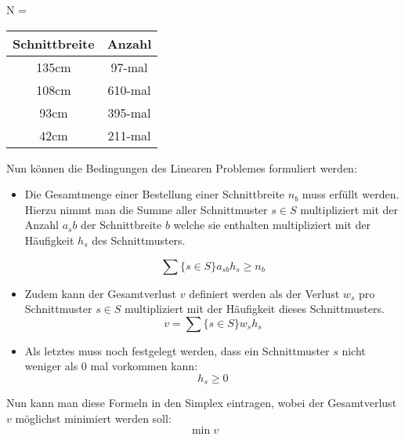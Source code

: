 \begin{itemize}
\begin{itemize}
N = \begin{tabular}{|c|c|}
\hline Schnittbreite & Anzahl \\
\hline 135cm & 97-mal \\ 
\hline 108cm & 610-mal \\ 
\hline 93cm & 395-mal \\ 
\hline 42cm & 211-mal \\ 
\hline 
\end{tabular} 
\end{itemize}
\end{itemize}

Nun können die Bedingungen des Linearen Problemes formuliert werden:

\begin{itemize}
\item Die Gesamtmenge einer Bestellung einer Schnittbreite $n_b$ muss erfüllt werden. Hierzu nimmt man die Summe aller Schnittmuster $s \in S$ multipliziert mit der Anzahl $a_sb$ der Schnittbreite $b$ welche sie enthalten multipliziert mit der Häufigkeit $h_s$ des Schnittmusters.

\[ \sum\{s \in S\}a_{sb} h_s \geq n_b \]
\item Zudem kann der Gesamtverlust $v$ definiert werden als der Verlust $w_s$ pro Schnittmuster $s \in S$ multipliziert mit der Häufigkeit dieses Schnittmusters.
\[ v = \sum\{s \in S\}w_s h_s  \] 
\item Als letztes muss noch festgelegt werden, dass ein Schnittmuster $s$ nicht weniger als 0 mal vorkommen kann:
\[ h_s \geq 0 \]
\end{itemize}

Nun kann man diese Formeln in den Simplex eintragen, wobei der Gesamtverlust $v$ möglichst minimiert werden soll: 
\[ \min v \] 